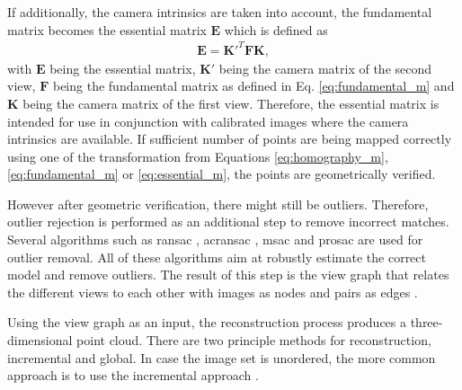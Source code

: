 If additionally, the camera intrinsics are taken into account, the fundamental matrix becomes the essential matrix $\textbf{E}$ which is defined as
\begin{align}
    \textbf{E} = \textbf{K}'^{T}\textbf{F}\textbf{K}, \label{eq:essential_m}
\end{align}
with $\textbf{E}$ being the essential matrix, $\textbf{K}'$ being the camera matrix of the second view, $\textbf{F}$ being the fundamental matrix as defined in Eq. \ref{eq:fundamental_m} and $\textbf{K}$ being the camera matrix of the first view. Therefore, the essential matrix is intended for use in conjunction with calibrated images where the camera intrinsics are available.
If sufficient number of points are being mapped correctly using one of the transformation from Equations \ref{eq:homography_m}, \ref{eq:fundamental_m} or \ref{eq:essential_m}, the points are geometrically verified.

However after geometric verification, there might still be outliers. Therefore, outlier rejection is performed as an additional step to remove incorrect matches. Several algorithms such as \gls{ransac} \cite{fischler1981random}, \gls{acransac} \cite{moisan2012automatic}, \gls{msac} \cite{wang2009generalized} and \gls{prosac} \cite{chum2005matching} are used for outlier removal. All of these algorithms aim at robustly estimate the correct model and remove outliers. The result of this step is the view graph that relates the different views to each other with images as nodes and pairs as edges \cite{schonberger2016structure}.

Using the view graph as an input, the reconstruction process produces a three-dimensional point cloud. There are two principle methods for reconstruction, incremental and global. In case the image set is unordered, the more common approach is to use the incremental approach \cite{schonberger2016structure}.

